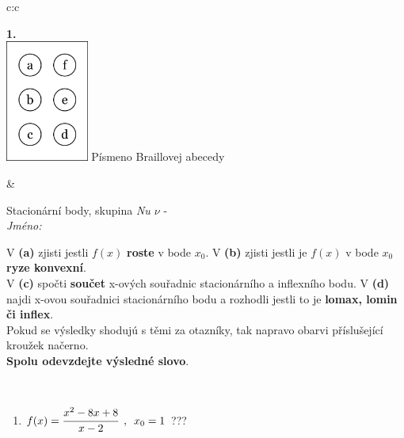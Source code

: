 \documentclass[10pt]{report}
\begin{document}
\begin{tabular}{c:c}
\begin{minipage}[c][104.5mm][t]{0.5\linewidth}
\begin{center}
\begin{minipage}{0.79\linewidth}
\end{minipage}
\begin{minipage}{0.20\linewidth}
\begin{center}
{\Huge\bfseries 1.} \\[2mm]
\includegraphics[height=40mm]{../images/braille.png}
{\small Písmeno Braillovej abecedy}
\end{center}
\end{minipage}
\end{center}
\end{minipage}
&
\begin{minipage}[c][104.5mm][t]{0.5\linewidth}
\begin{center}
\vspace{7mm}
{\huge Stacionární body, skupina \textit{Nu $\nu$} -}\\[5mm]
\textit{Jméno:}\phantom{xxxxxxxxxxxxxxxxxxxxxxxxxxxxxxxxxxxxxxxxxxxxxxxxxxxxxxxxxxxxxxxxx}\\[5mm]
\begin{minipage}{0.95\linewidth}
\begin{center}
{\small V \textbf{(a)} zjisti jestli $f(x)$ \textbf{roste} v bode $x_0$. V \textbf{(b)} zjisti jestli je $f(x)$ v bode $x_0$ \textbf{ryze konvexní}.\\V \textbf{(c)} spočti \textbf{součet} x-ových souřadnic stacionárního a inflexního bodu. V \textbf{(d)} najdi x-ovou souřadnici stacionárního bodu a rozhodli jestli to je \textbf{lomax, lomin či inflex}.\\Pokud se výsledky shodujú s těmi za otazníky, tak napravo obarvi příslušející kroužek načerno.\\\textbf{Spolu odevzdejte výsledné slovo}}.
\end{center}
\end{minipage}
\\[1mm]
\begin{minipage}{0.79\linewidth}
\begin{center}
\begin{varwidth}{\linewidth}
\begin{enumerate}
\normalsize
\item $f(x)=\cfrac{x^2-8x+8}{x-2}\enspace , \enspace x_0=1$\quad \dotfill\; ???\;\dotfill \quad {}

\end{enumerate}
\end{varwidth}
\end{center}
\end{minipage}
\end{center}
\end{minipage}
\end{tabular}
\end{document}
